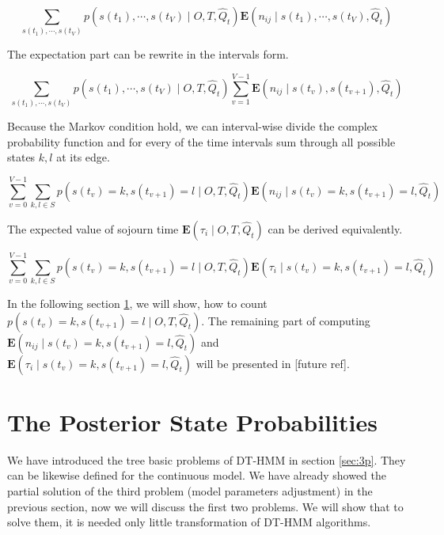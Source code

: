 \documentclass[thesis=M,english]{FITthesis}[2012/10/20]
\begin{document}
\begin{equation} 
\sum_{s(t_1),\cdots,s(t_V)} p(s(t_1),\cdots,s(t_V) \mid O,T, \hat Q_t) \mathbf{E}(n_{ij} \mid s(t_1),\cdots,s(t_V) ,\hat Q_t )
\end{equation}

The expectation part can be rewrite in the intervals form.  

\begin{equation}
 \sum_{s(t_1),\cdots,s(t_V)} p(s(t_1),\cdots,s(t_V) \mid O,T, \hat Q_t) \sum_{v=1}^{V-1}\mathbf{E}(n_{ij} \mid s(t_v),s(t_{v+1}) ,\hat Q_t )
\end{equation}

Because the Markov condition hold, we can interval-wise divide the complex probability function and for every of the time intervals sum through all possible states $k,l$ at its edge. 

\begin{equation}
\sum_{v=0}^{V-1} \sum_{k,l \in S} p(s(t_v) = k,s(t_{v+1}) = l \mid O,T, \hat Q_t) \mathbf{E}(n_{ij} \mid s(t_v) = k,s(t_{v+1}) = l,\hat Q_t )
\end{equation}

The expected value of sojourn time $\mathbf{E}( \tau_i \mid O,T, \hat Q_t )$ can be derived equivalently.

\begin{equation}
\sum_{v=0}^{V-1} \sum_{k,l \in S} p(s(t_v) = k,s(t_{v+1}) = l \mid O,T, \hat Q_t) \mathbf{E}(\tau_i \mid s(t_v) = k,s(t_{v+1}) = l,\hat Q_t )
\end{equation}

In the following section \ref{sec:pos}, we will show, how to count $p(s(t_v) = k,s(t_{v+1}) = l \mid O,T, \hat Q_t)$. The remaining part of computing $\mathbf{E}(n_{ij} \mid s(t_v) = k,s(t_{v+1}) = l,\hat Q_t )$ and $\mathbf{E}(\tau_i \mid s(t_v) = k,s(t_{v+1}) = l,\hat Q_t )$ will be presented in [future ref]. 

\section{The Posterior State Probabilities}\label{sec:pos}

We have introduced the tree basic problems of DT-HMM in section \ref{sec:3p}. They can be likewise defined for the continuous model. We have already showed the partial solution of the third problem (model parameters adjustment) in the previous section, now we will discuss the first two problems. We will show that to solve them, it is needed only little transformation of DT-HMM algorithms.
\end{document}
